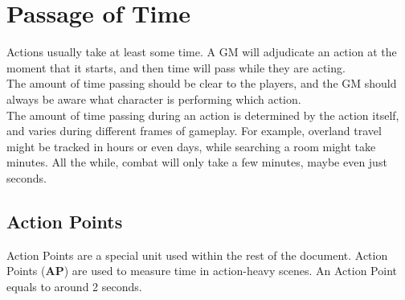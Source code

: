 \section{Passage of Time}\label{sec:passageOfTime}
Actions usually take at least some time.
A GM will adjudicate an action at the moment that it starts, and then time will pass while they are acting.\\
The amount of time passing should be clear to the players, and the GM should always be aware what character is performing which action.\\
The amount of time passing during an action is determined by the action itself, and varies during different frames of gameplay.
For example, overland travel might be tracked in hours or even days, while searching a room might take minutes.
All the while, combat will only take a few minutes, maybe even just seconds.

\subsection{Action Points}\label{subsec:actionPoints}
Action Points are a special unit used within the rest of the document.
Action Points (\textbf{AP}) are used to measure time in action-heavy scenes.
An Action Point equals to around 2 seconds.






